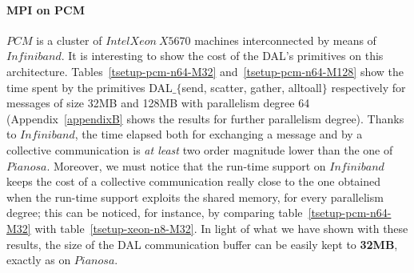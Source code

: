 \paragraph{MPI on PCM}
$PCM$ is a cluster of $IntelXeon\ X5670$ machines interconnected by means of $Infiniband$. It is interesting to show the cost of the DAL's primitives on this architecture. Tables~\ref{tsetup-pcm-n64-M32} and~\ref{tsetup-pcm-n64-M128} show the time spent by the primitives DAL$\_\lbrace$send, scatter, gather, alltoall$\rbrace$ respectively for messages of size 32MB and 128MB with parallelism degree 64 (Appendix~\ref{appendixB} shows the results for further parallelism degree). Thanks to $Infiniband$, the time elapsed both for exchanging a message and by a collective communication is \textit{at least} two order magnitude lower than the one of $Pianosa$. Moreover, we must notice that the run-time support on $Infiniband$ keeps the cost of a collective communication really close to the one obtained when the run-time support exploits the shared memory, for every parallelism degree; this can be noticed, for instance, by comparing table~\ref{tsetup-pcm-n64-M32} with table~\ref{tsetup-xeon-n8-M32}. In light of what we have shown with these results, the size of the DAL communication buffer can be easily kept to \textbf{32MB}, exactly as on $Pianosa$.

